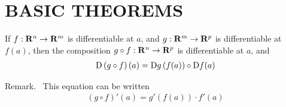 \clearpage
\section{BASIC THEOREMS}
\begin{theorem}
    If $f:\mathbf{R}^n\to \mathbf{R}^m$ is differentiable at $a$, and $g: \mathbf{R}^m\to \mathbf{R}^p$ is 
    differentiable at $f(a)$, then the composition $g\circ f:\mathbf{R}^n\to \mathbf{R}^p$ is differentiable
    at $a$, and 
    \begin{align*}
        \mathrm{D}\left(g\circ f\right)(a) = \mathrm{D}g\left(f(a)\right)\circ \mathrm{D}f(a)
    \end{align*}

    Remark.~ This equation can be written 
    \begin{align*}
        (g\circ f)'(a) = g'(f(a))\cdot f'(a)
    \end{align*}
\end{theorem}

